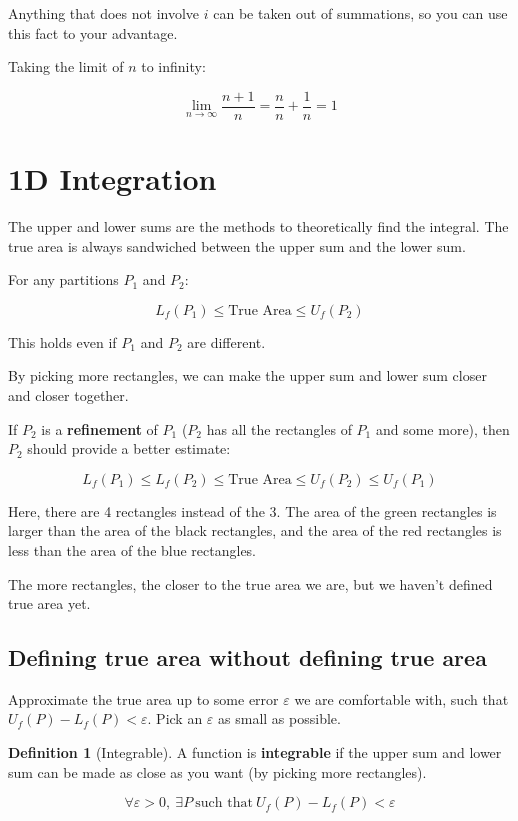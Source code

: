 \documentclass[12pt]{article}
\theoremstyle{plain}
\theoremstyle{remark}
\theoremstyle{definition}
\newtheorem{definition}{Definition}[section]
\begin{document}
Anything that does not involve \(i\) can be taken out of summations, so
you can use this fact to your advantage.

Taking the limit of \(n\) to infinity:

\[\lim_{n \rightarrow \infty}\frac{n + 1}{n} = \frac{n}{n} + \frac{1}{n} = 1\]


\section{1D Integration}

The upper and lower sums are the methods to theoretically find the
integral. The true area is always sandwiched between the upper sum and
the lower sum.

For any partitions \(P_{1}\) and \(P_{2}\):

\[L_{f}\left( P_{1} \right) \leq \text{True\ Area} \leq U_{f}\left( P_{2} \right)\]

This holds even if \(P_{1}\) and \(P_{2}\) are different.


By picking more rectangles, we can make the upper sum and lower sum
closer and closer together.

If \(P_{2}\) is a \textbf{refinement} of \(P_{1}\) (\(P_{2}\) has all
the rectangles of \(P_{1}\) and some more), then \(P_{2}\) should
provide a better estimate:

\[L_{f}\left( P_{1} \right) \leq L_{f}\left( P_{2} \right) \leq \text{True\ Area} \leq U_{f}\left( P_{2} \right) \leq U_{f}\left( P_{1} \right)\]


Here, there are 4 rectangles instead of the 3. The area of the green
rectangles is larger than the area of the black rectangles, and the area
of the red rectangles is less than the area of the blue rectangles.


The more rectangles, the closer to the true area we are, but we haven't
defined true area yet.


\subsection{Defining true area without defining true
area}

Approximate the true area up to some error \(\varepsilon\) we are
comfortable with, such that \(U_{f}(P) - L_{f}(P) < \varepsilon\). Pick
an \(\varepsilon\) as small as possible.

\begin{definition}[Integrable]
A function is \textbf{integrable} if
the upper sum and lower sum can be made as close as you want (by picking
more rectangles).

\[\forall\varepsilon > 0,\ \exists P\ \text{such\ that}\ U_{f}(P) - L_{f}(P) < \varepsilon\]
\end{definition}
\end{document}
